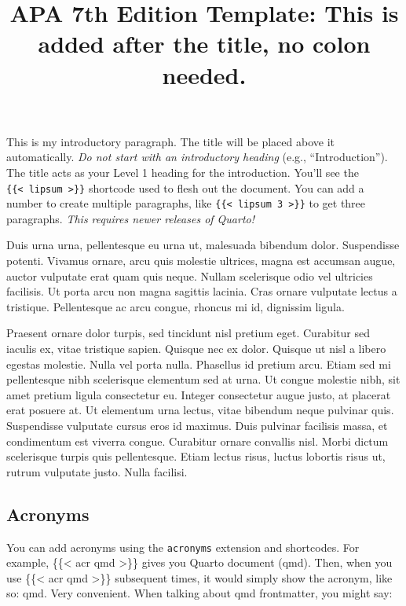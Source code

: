 \documentclass[
  man,
  floatsintext,
  longtable,
  nolmodern,
  notxfonts,
  notimes,
  mask,
  colorlinks=true,linkcolor=blue,citecolor=blue,urlcolor=blue]{apa7}
\title{APA 7th Edition Template: This is added after the title, no colon
needed.}
\begin{document}
\maketitle
\setcounter{secnumdepth}{-\maxdimen} %

\setlength\LTleft{0pt}

\resetlinenumber[1]

This is my introductory paragraph. The title will be placed above it
automatically. \emph{Do not start with an introductory heading} (e.g.,
``Introduction''). The title acts as your Level 1 heading for the
introduction. You'll see the
\texttt{\{\{\textless{}\ lipsum\ \textgreater{}\}\}} shortcode used to
flesh out the document. You can add a number to create multiple
paragraphs, like \texttt{\{\{\textless{}\ lipsum\ 3\ \textgreater{}\}\}}
to get three paragraphs. \emph{This requires newer releases of Quarto!}

Duis urna urna, pellentesque eu urna ut, malesuada bibendum dolor.
Suspendisse potenti. Vivamus ornare, arcu quis molestie ultrices, magna
est accumsan augue, auctor vulputate erat quam quis neque. Nullam
scelerisque odio vel ultricies facilisis. Ut porta arcu non magna
sagittis lacinia. Cras ornare vulputate lectus a tristique. Pellentesque
ac arcu congue, rhoncus mi id, dignissim ligula.

Praesent ornare dolor turpis, sed tincidunt nisl pretium eget. Curabitur
sed iaculis ex, vitae tristique sapien. Quisque nec ex dolor. Quisque ut
nisl a libero egestas molestie. Nulla vel porta nulla. Phasellus id
pretium arcu. Etiam sed mi pellentesque nibh scelerisque elementum sed
at urna. Ut congue molestie nibh, sit amet pretium ligula consectetur
eu. Integer consectetur augue justo, at placerat erat posuere at. Ut
elementum urna lectus, vitae bibendum neque pulvinar quis. Suspendisse
vulputate cursus eros id maximus. Duis pulvinar facilisis massa, et
condimentum est viverra congue. Curabitur ornare convallis nisl. Morbi
dictum scelerisque turpis quis pellentesque. Etiam lectus risus, luctus
lobortis risus ut, rutrum vulputate justo. Nulla facilisi.

\subsection{Acronyms}\label{acronyms}

You can add acronyms using the \texttt{acronyms} extension and
shortcodes. For example, \{\{\textless{} acr qmd \textgreater\}\} gives
you Quarto document (qmd). Then, when you use
\{\{\textless{} acr qmd \textgreater\}\} subsequent times, it would
simply show the acronym, like so: qmd. Very convenient. When talking
about qmd frontmatter, you might say:
\end{document}
